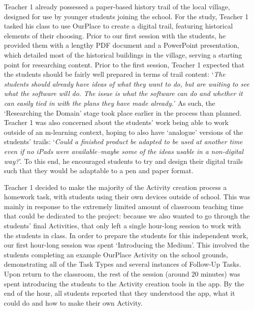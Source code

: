 \documentclass[,hyphens]{sigchi}
\begin{document}
Teacher 1 already possessed a paper-based history trail of the local village, designed for use by younger students joining the school. For the study, Teacher 1 tasked his class to use OurPlace to create a digital trail, featuring historical elements of their choosing. Prior to our first session with the students, he provided them with a lengthy PDF document and a PowerPoint presentation, which detailed most of the historical buildings in the village, serving a starting point for researching content. Prior to the first session, Teacher 1 expected that the students should be fairly well prepared in terms of trail content: `\textit{The students should already have ideas of what they want to do, but are waiting to see what the software will do. The issue is what the software can do and whether it can easily tied in with the plans they have made already.}'  As such, the `Researching the Domain' stage took place earlier in the process than planned. Teacher 1 was also concerned about the students' work being able to work outside of an m-learning context, hoping to also have `analogue' versions of the students' trails: `\textit{Could a finished product be adapted to be used at another time even if no iPads were available--maybe some of the ideas usable in a non-digital way?}'. To this end, he encouraged students to try and design their digital trails such that they would be adaptable to a pen and paper format.

Teacher 1 decided to make the majority of the Activity creation process a homework task, with students using their own devices outside of school. This was mainly in response to the extremely limited amount of classroom teaching time that could be dedicated to the project: because we also wanted to go through the students' final Activities, that only left a single hour-long session to work with the students in class. In order to prepare the students for this independent work, our first hour-long session was spent `Introducing the Medium'. This involved the students completing an example OurPlace Activity on the school grounds, demonstrating all of the Task Types and several instances of Follow-Up Tasks. Upon return to the classroom, the rest of the session (around 20 minutes) was spent introducing the students to the Activity creation tools in the app. By the end of the hour, all students reported that they understood the app, what it could do and how to make their own Activity.
\end{document}
